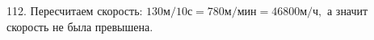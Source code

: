 112. Пересчитаем скорость: $130\text{м}/10\text{с}=780\text{м}/\text{мин}=46800\text{м}/\text{ч},$ а значит скорость не была превышена.\\
